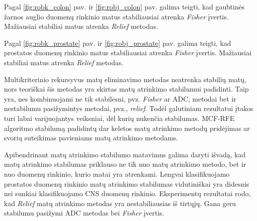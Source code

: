Pagal \ref{fig:robk_colon} pav. ir \ref{fig:robj_colon} pav. galima teigti, kad gaubtinės žarnos auglio duomenų rinkinio matus stabiliausiai atrenka \textit{Fisher} įvertis. Mažiausiai stabiliai matus atrenka \textit{Relief} metodas.

Pagal \ref{fig:robk_prostate} pav. ir \ref{fig:robj_prostate} pav. galima teigti, kad prostatos duomenų rinkinio matus stabiliausiai atrenka \textit{Fisher} įvertis. Mažiausiai stabiliai matus atrenka \textit{Relief} metodas.

Multikriterinio rekursyvus matų eliminavimo metodas neatrenka stabilių matų, nors teoriškai šis metodas yra skirtas matų atrinkimo stabilumui padidinti. Taip yra, nes kombinuojami ne tik stabilesni, pvz. \textit{Fisher} ar ADC, metodai bet ir nestabilumu pasižymintys metodai, pvz., \textit{relief}. Todėl galutiniam rezultatui įtakos turi labai varijuojantys veiksniai, dėl kurių nukenčia stabilumas. MCF-RFE algoritmo stabilumą padidintų dar keletos matų atrinkimo metodų pridėjimas ar svorių suteikimas pavieniams matų atrinkimo metodams.

Apibendrinant matų atrinkimo stabilumo matavimus galima daryti išvadą, kad matų atrinkimo stabilumas priklauso ne tik nuo matų atrinkimo metodo, bet ir nuo duomenų rinkinio, kurio matai yra atrenkami. Lengvai klasifikuojamo prostatos duomenų rinkinio matų atrinkimo stabilumas vidutiniškai yra didesnis nei sunkiai klasifikuojamo CNS duomenų rinkinio. Eksperimentų rezultatai rodo, kad \textit{Relief} matų atrinkimo metodas yra nestabiliausias iš tirtųjų. Gana geru stabilumu pasižymi ADC metodas bei \textit{Fisher} įvertis.

